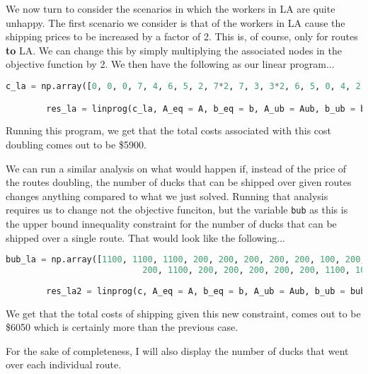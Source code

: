 \documentclass[11pt]{article}
\begin{document}
    We now turn to consider the scenarios in which the workers in LA are quite
    unhappy. The first scenario we consider is that of the workers in LA cause
    the shipping prices to be increased by a factor of 2. This is, of course,
    only for routes \textbf{to} LA. We can change this by simply multiplying
    the associated nodes in the objective function by 2. We then have the
    following as our linear program...

    \begin{lstlisting}[style=mystyle, language=Python, gobble=8, caption=LA
    routes double in price]
        c_la = np.array([0, 0, 0, 7, 4, 6, 5, 2, 7*2, 7, 3, 3*2, 6, 5, 0, 4, 2, 2, 6, 4, 0, 5*2, 0, 0, 0])

        res_la = linprog(c_la, A_eq = A, b_eq = b, A_ub = Aub, b_ub = bub)
    \end{lstlisting}

   Running this program, we get that the total costs associated with this cost
   doubling comes out to be \$5900.

   We can run a similar analysis on what would happen if, instead of the price
   of the routes doubling, the number of ducks that can be shipped over given
   routes changes anything compared to what we just solved. Running that
   analysis requires us to change not the objective funciton, but the variable
   \texttt{bub} as this is the upper bound innequality constraint for the
   number of ducks that can be shipped over a single route. That would look
   like the following...

    \begin{lstlisting}[style=mystyle, language=Python, gobble=8, caption=LA
    routes cut volume in half]
        bub_la = np.array([1100, 1100, 1100, 200, 200, 200, 200, 200, 100, 200, 200, 100, 200, 
                           200, 1100, 200, 200, 200, 200, 200, 1100, 100, 1100, 1100, 1100])
        
        res_la2 = linprog(c, A_eq = A, b_eq = b, A_ub = Aub, b_ub = bub_la)
    \end{lstlisting}

    We get that the total costs of shipping given this new constraint, comes
    out to be \$6050 which is certainly more than the previous case.

    For the sake of completeness, I will also display the number of ducks that
    went over each individual route.
\end{document}
